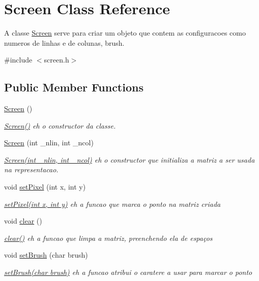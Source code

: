 \hypertarget{classScreen}{}\section{Screen Class Reference}
\label{classScreen}


A classe \hyperlink{classScreen}{Screen} serve para criar um objeto que contem as configuracoes como numeros de linhas e de colunas, brush.  




{\ttfamily \#include $<$screen.\+h$>$}

\subsection*{Public Member Functions}
\begin{DoxyCompactItemize}
\item 
\mbox{\label{classScreen_ae7576476fc6e6a6eaa66389fdc41fe72}} 
\hyperlink{classScreen_ae7576476fc6e6a6eaa66389fdc41fe72}{Screen} ()
\begin{DoxyCompactList}\small\item\em \hyperlink{classScreen_ae7576476fc6e6a6eaa66389fdc41fe72}{Screen()} eh o constructor da classe. \end{DoxyCompactList}\item 
\hyperlink{classScreen_a6c21beca43d25854d8674445127ef2eb}{Screen} (int \+\_\+nlin, int \+\_\+ncol)
\begin{DoxyCompactList}\small\item\em \hyperlink{classScreen_a6c21beca43d25854d8674445127ef2eb}{Screen(int \+\_\+nlin, int \+\_\+ncol)} eh o constructor que initializa a matriz a ser usada na representacao. \end{DoxyCompactList}\item 
void \hyperlink{classScreen_ae6bea81c57a22d226507c3c26fa95ee0}{set\+Pixel} (int x, int y)
\begin{DoxyCompactList}\small\item\em \hyperlink{classScreen_ae6bea81c57a22d226507c3c26fa95ee0}{set\+Pixel(int x, int y)} eh a funcao que marca o ponto na matriz criada \end{DoxyCompactList}\item 
\mbox{\label{classScreen_a35e74266b2a04e37b354ceff7a5f1031}} 
void \hyperlink{classScreen_a35e74266b2a04e37b354ceff7a5f1031}{clear} ()
\begin{DoxyCompactList}\small\item\em \hyperlink{classScreen_a35e74266b2a04e37b354ceff7a5f1031}{clear()} eh a funcao que limpa a matriz, preenchendo ela de espaços \end{DoxyCompactList}\item 
void \hyperlink{classScreen_a14a00e158f99df199772172554a20576}{set\+Brush} (char brush)
\begin{DoxyCompactList}\small\item\em \hyperlink{classScreen_a14a00e158f99df199772172554a20576}{set\+Brush(char brush)} eh a funcao atribui o caratere a usar para marcar o ponto \end{DoxyCompactList}\end{DoxyCompactItemize}
